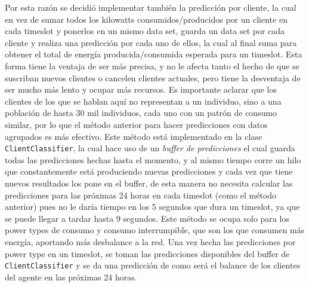 Por esta razón se decidió implementar también la predicción por cliente, la cual en vez de sumar todos los kilowatts consumidos/producidos por un cliente en cada timeslot y ponerlos en un mismo data set, guarda un data set por cada cliente y realiza una predicción por cada uno de ellos, la cual al final suma para obtener el total de energía producida/consumida esperada para un timeslot. 
Esta forma tiene la ventaja de ser más precisa, y no le afecta tanto el hecho de que se suscriban nuevos clientes o cancelen clientes actuales, pero tiene la desventaja de ser mucho más lento y ocupar más recursos. 
Es importante aclarar que los clientes de los que se hablan aquí no representan a un individuo, sino a una población de hasta 30 mil individuos, cada uno con un patrón de consumo similar, por lo que el método anterior para hacer predicciones con datos agrupados es más efectivo.
Este método está implementado en la clase \texttt{ClientClassifier}, la cual hace uso de un \textit{buffer de predicciones} el cual guarda todas las predicciones hechas hasta el momento, y al mismo tiempo corre un hilo que constantemente está produciendo nuevas predicciones y cada vez que tiene nuevos resultados los pone en el buffer, de esta manera no necesita calcular las predicciones para las próximas 24 horas en cada timeslot (como el método anterior) pues no le daría tiempo en los 5 segundos que dura un timeslot, ya que se puede llegar a tardar hasta 9 segundos. Este método se ocupa solo para los power types de consumo y consumo interrumpible, que son los que consumen más energía, aportando más desbalance a la red.
Una vez hecha las predicciones por power type en un timeslot, se toman las predicciones disponibles del buffer de \texttt{ClientClassifier} y se da una predicción de como será el balance de los clientes del agente en las próximas 24 horas.


